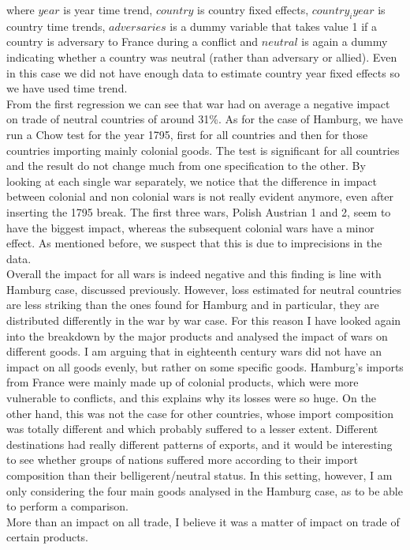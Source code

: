 \documentclass[12pt,a4paper,titlepage,english]{article}
\begin{document}
where $year$ is year time trend, $country$ is country fixed effects, $country_iyear$ is country time trends, $adversaries$ is a dummy variable that takes value 1 if a country is adversary to France during a conflict and $neutral$ is again a dummy indicating whether a country was neutral (rather than adversary or allied). Even in this case we did not have enough data to estimate country year fixed effects so we have used time trend.\\
From the first regression we can see that war had on average a negative impact on trade of neutral countries of around 31\%. As for the case of Hamburg, we have run a Chow test for the year 1795, first for all countries and then for those countries importing mainly colonial goods. The test is significant for all countries and the result do not change much from one specification to the other. 
By looking at each single war separately, we notice that the difference in impact between colonial and non colonial wars is not really evident anymore, even after inserting the 1795 break. The first three wars, Polish Austrian 1 and 2, seem to have the biggest impact, whereas the subsequent colonial wars have a minor effect. As mentioned before, we suspect that this is due to imprecisions in the data. \\
Overall the impact for all wars is indeed negative and this finding is line with Hamburg case, discussed previously. However, loss estimated for neutral countries are less striking than the ones found for Hamburg and in particular, they are distributed differently  in the war by war case.
For this reason I have looked again into the breakdown by the major products and analysed the impact of wars on different goods. I am arguing that in eighteenth century wars did not have an impact on all goods evenly, but rather on some specific goods. Hamburg's imports from France were mainly made up of colonial products, which were more vulnerable to conflicts, and this explains why its losses were so huge. On the other hand, this was not the case for other countries, whose import composition was totally different and which probably suffered to a lesser extent. Different destinations had really different patterns of exports, and it would be interesting to see whether groups of nations suffered more according to their import composition than their belligerent/neutral status. 
In this setting, however, I am only considering the four main goods analysed in the Hamburg case, as to be able to perform a comparison.\\
More than an impact on all trade, I believe it was a matter of impact on trade of certain products. \\
\end{document}

